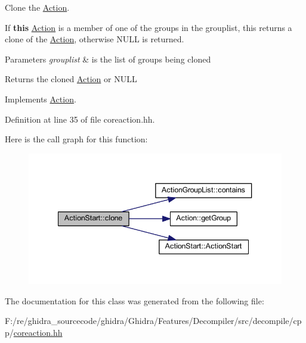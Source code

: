 Clone the \mbox{\hyperlink{class_action}{Action}}. 

If {\bfseries{this}} \mbox{\hyperlink{class_action}{Action}} is a member of one of the groups in the grouplist, this returns a clone of the \mbox{\hyperlink{class_action}{Action}}, otherwise N\+U\+LL is returned. 
\begin{DoxyParams}{Parameters}
{\em grouplist} & is the list of groups being cloned \\
\hline
\end{DoxyParams}
\begin{DoxyReturn}{Returns}
the cloned \mbox{\hyperlink{class_action}{Action}} or N\+U\+LL 
\end{DoxyReturn}


Implements \mbox{\hyperlink{class_action_af8242e41d09e5df52f97df9e65cc626f}{Action}}.



Definition at line 35 of file coreaction.\+hh.

Here is the call graph for this function\+:
\nopagebreak
\begin{figure}[H]
\begin{center}
\leavevmode
\includegraphics[width=340pt]{class_action_start_af8fffe0d933032d6c1e18ef97266d871_cgraph}
\end{center}
\end{figure}


The documentation for this class was generated from the following file\+:\begin{DoxyCompactItemize}
\item 
F\+:/re/ghidra\+\_\+sourcecode/ghidra/\+Ghidra/\+Features/\+Decompiler/src/decompile/cpp/\mbox{\hyperlink{coreaction_8hh}{coreaction.\+hh}}\end{DoxyCompactItemize}
